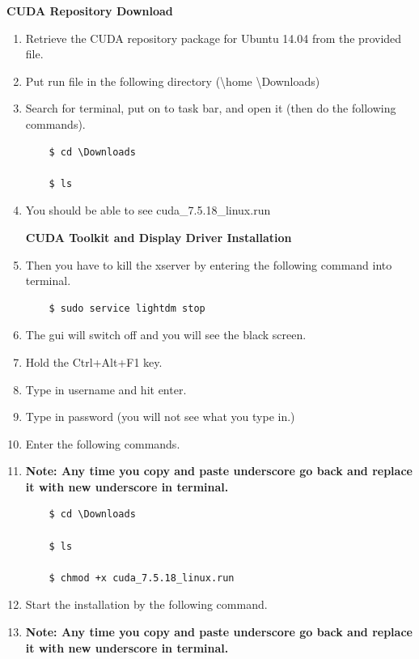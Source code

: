 \documentclass[12pt]{article}
\begin{document}
\textbf{CUDA Repository Download}
\begin{enumerate}
  \item Retrieve the CUDA repository package for Ubuntu 14.04 from the provided file.
  \item Put run file in the following directory (\textbackslash home \textbackslash Downloads)
   \item Search for terminal, put on to task bar, and open it (then do the following commands).

\begin{lstlisting}
    $ cd \Downloads

    $ ls
\end{lstlisting}

    \item You should be able to see cuda\_7.5.18\_linux.run

\textbf{CUDA Toolkit and Display Driver Installation}

    \item Then you have to kill the xserver by entering the following command into terminal.

\begin{lstlisting}
    $ sudo service lightdm stop
\end{lstlisting}

    \item The gui will switch off and you will see the black screen.
    \item Hold the Ctrl+Alt+F1 key.
    \item Type in username and hit enter.
    \item Type in password (you will not see what you type in.)
    \item Enter the following commands.
    \item \textbf{Note: Any time you copy and paste underscore go back and replace it with new underscore in terminal.}

\begin{lstlisting}
    $ cd \Downloads

    $ ls

    $ chmod +x cuda_7.5.18_linux.run
\end{lstlisting}

    \item Start the installation by the following command.
    \item \textbf{Note: Any time you copy and paste underscore go back and replace it with new underscore in terminal.}


\end{enumerate}
\end{document}
